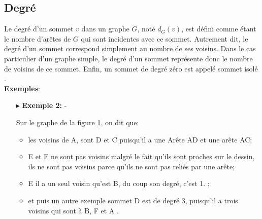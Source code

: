 \documentclass[hidelinks,letterpaper,12pt]{article}
\newcounter{Exemple} %
\begin{document}
\subsection{Degré}
\label{Degré} 
Le degré d'un sommet $v$ dans un graphe $G$, noté $d_G(v)$, est défini comme étant le nombre d'arêtes de $G$ qui sont incidentes avec ce sommet. Autrement dit, le degré d'un sommet correspond simplement au nombre de ses voisins. Dans le cas particulier d'un graphe simple, le degré d'un sommet représente donc le nombre de voisins de ce sommet. Enfin, un sommet de degré zéro est appelé sommet isolé \citep{Bondy-Murty}. 
\\
\textbf{Exemples}:
\begin{itemize}
\item[$\blacktriangleright$] \textbf{Exemple 2:}
{\color{white}-} %
\begin{figure}[H]
	\centering		
	\label{Exemple différents cas de voisinage}	
\end{figure}	
Sur le graphe de la figure \ref{Exemple différents cas de voisinage}, on dit que:
\begin{itemize}
	\item les voisins de A, sont D et C puisqu'il a une Arête AD et une arête AC;
	\\
	\item E et F ne sont pas voisins malgré le fait qu'ils sont proches sur le dessin, ils ne sont pas voisins parce qu'ils ne sont pas reliés par une arête; 
	\\
	\item E il a un seul voisin qu’est B, du coup son degré, c'est 1. \citep{Bondy-Murty};
	\\
	\item et puis un autre exemple sommet D est de degré 3, puisqu'il a trois voisins qui sont à B, F et A \citep{ChristianLaforest}.
\end{itemize}
\bigbreak 
\end{itemize}		
\bigbreak  
\end{document}
